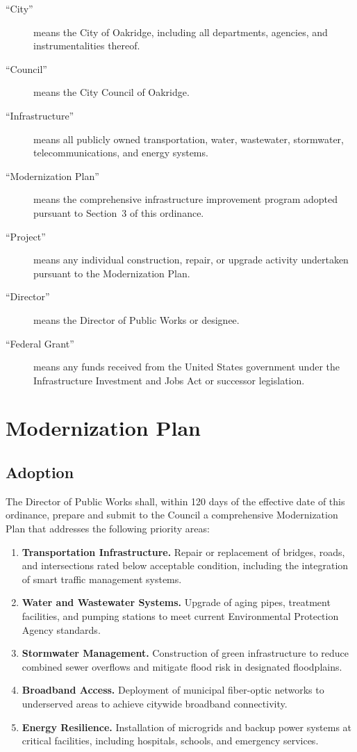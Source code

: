 \documentclass[
    language=english,
    doctype=article,
    institution=none,
]{../../omnilatex}
\begin{document}
\begin{description}
    \item[``City''] means the City of Oakridge, including all departments,
        agencies, and instrumentalities thereof.
    \item[``Council''] means the City Council of Oakridge.
    \item[``Infrastructure''] means all publicly owned transportation,
        water, wastewater, stormwater, telecommunications, and energy
        systems.
    \item[``Modernization Plan''] means the comprehensive infrastructure
        improvement program adopted pursuant to Section~3 of this ordinance.
    \item[``Project''] means any individual construction, repair, or
        upgrade activity undertaken pursuant to the Modernization Plan.
    \item[``Director''] means the Director of Public Works or designee.
    \item[``Federal Grant''] means any funds received from the United States
        government under the Infrastructure Investment and Jobs Act or
        successor legislation.
\end{description}

\section{Modernization Plan}

\subsection{Adoption}

The Director of Public Works shall, within 120 days of the effective date
of this ordinance, prepare and submit to the Council a comprehensive
Modernization Plan that addresses the following priority areas:

\begin{enumerate}
    \item \textbf{Transportation Infrastructure.} Repair or replacement of
        bridges, roads, and intersections rated below acceptable condition,
        including the integration of smart traffic management systems.
    \item \textbf{Water and Wastewater Systems.} Upgrade of aging pipes,
        treatment facilities, and pumping stations to meet current
        Environmental Protection Agency standards.
    \item \textbf{Stormwater Management.} Construction of green
        infrastructure to reduce combined sewer overflows and mitigate
        flood risk in designated floodplains.
    \item \textbf{Broadband Access.} Deployment of municipal fiber-optic
        networks to underserved areas to achieve citywide broadband
        connectivity.
    \item \textbf{Energy Resilience.} Installation of microgrids and
        backup power systems at critical facilities, including hospitals,
        schools, and emergency services.
\end{enumerate}
\end{document}
